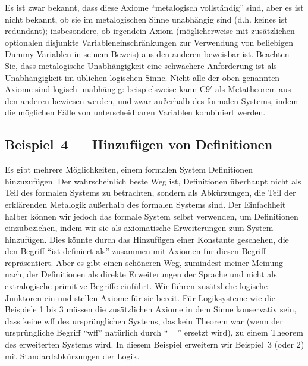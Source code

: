 Es ist zwar bekannt, dass diese Axiome "`metalogisch vollständig"' sind, aber es ist nicht bekannt, ob sie im metalogischen Sinne unabhängig sind (d.h. keines ist redundant); insbesondere, ob irgendein Axiom (möglicherweise mit zusätzlichen optionalen disjunkte Variableneinschränkungen zur Verwendung von beliebigen Dummy-Variablen in seinem Beweis) aus den anderen beweisbar ist.  Beachten Sie, dass metalogische Unabhängigkeit eine schwächere Anforderung ist als Unabhängigkeit im üblichen logischen Sinne.  Nicht alle der oben genannten Axiome sind logisch unabhängig: beispielsweise kann C9$'$ als Metatheorem aus den anderen bewiesen werden, und zwar außerhalb des formalen Systems, indem die möglichen Fälle von unterscheidbaren Variablen kombiniert werden. 

\subsection{Beispiel~4 --- Hinzufügen von Definitionen}

Es gibt mehrere Möglichkeiten, einem formalen System Definitionen hinzuzu\-fügen.  Der wahrscheinlich beste Weg ist, Definitionen überhaupt nicht als Teil des formalen Systems zu betrachten, sondern als Abkürzungen, die Teil der erklärenden Metalogik außerhalb des formalen Systems sind.  Der Einfachheit halber können wir jedoch das formale System selbst verwenden, um Definitionen einzubeziehen, indem wir sie als axiomatische Erweiterungen zum System hinzufügen.  Dies könnte durch das Hinzufügen einer Konstante geschehen, die den Begriff "`ist definiert als"' zusammen mit Axiomen für diesen Begriff repräsentiert. Aber es gibt einen schöneren Weg, zumindest meiner Meinung nach, der Definitionen als direkte Erweiterungen der Sprache und nicht als extralogische primitive Begriffe einführt.  Wir führen zusätzliche logische Junktoren ein und stellen Axiome für sie bereit.  Für Logiksysteme wie die Beispiele 1 bis 3 müssen die zusätzlichen Axiome in dem Sinne konservativ sein, dass keine wff des ursprünglichen Systems, das kein Theorem war (wenn der ursprüngliche Begriff "`wff"' natürlich durch "`$\vdash$"' ersetzt wird), zu einem Theorem des erweiterten Systems wird.  In diesem Beispiel erweitern wir Beispiel~3 (oder 2) mit Standardabkürzungen der Logik. 

